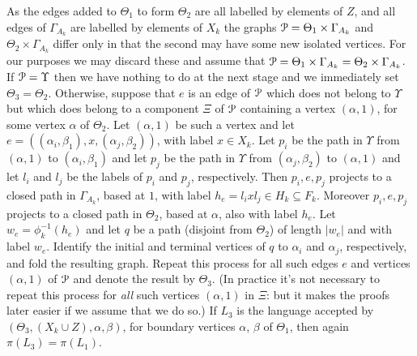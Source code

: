 \documentclass[a4paper,12pt]{article}
\renewcommand{\a}{\alpha }
\renewcommand{\b}{\beta }
\newcommand{\G}{\Gamma }
\newcommand{\T}{\Theta }
\newcommand{\U}{\Upsilon }
\newcommand{\cP}{{\cal{P}}}
\numberwithin{equation}{section}
\numberwithin{figure}{section}
\begin{document}
As the edges added to $\T_1$ to form $\T_2$ are all labelled by elements
of $Z$, and all edges of $\G_{A_k}$ are labelled by elements of $X_k$
the graphs $\cP=\T_1\times \G_{A_k}$ and $\T_2\times \G_{A_k}$ differ only
in that the second may have some new isolated vertices. For our purposes
we may discard these and assume that $\cP=\T_1\times \G_{A_k}=
 \T_2\times \G_{A_k}$. If $\cP=\U$ then we have nothing to do at the
next stage and we immediately set $\T_3=\T_2$. Otherwise,
suppose that $e$ is an edge of $\cP$ which does not belong to $\U$ but
which does belong to a component $\Xi$  of $\cP$ containing a vertex
$(\a,1)$, for some vertex $\a$ of $\T_2$.
Let $(\a,1)$ be such a vertex and let
$e=((\a_i,\b_1), x, (\a_j,\b_2))$,
 with label $x\in X_k$.
 Let $p_i$ be
the path in $\U$ from $(\a,1)$ to $(\a_i,\b_1)$ and let $p_j$ be
the path in $\U$ from  $(\a_j,\b_2)$ to $(\a,1)$ and
let $l_i$ and $l_j$ be the labels of $p_i$ and $p_j$, respectively. Then
$p_i,e,p_j$ projects to a closed path in $\G_{A_k}$, based at $1$, with
label $h_e=l_i x l_j \in H_k\subseteq F_k$. Moreover
$p_i,e,p_j$ projects to a closed path in $\T_2$, based at $\a$, also
with label $h_e$. Let
$w_e=\phi_k^{-1}(h_e)$ and let
$q$ be a path (disjoint from $\T_2$) of length
$|w_e|$ and with label $w_e$. Identify the initial and terminal
vertices of $q$ to $\a_i$ and $\a_j$, respectively, and fold the
resulting graph. Repeat this process for all such edges $e$ and
vertices $(\a,1)$ of $\cP$
and denote the result by $\T_3$.
(In practice it's not necessary to
repeat this process for {\em all} such vertices $(\a,1)$ in $\Xi$: but it
makes the proofs later easier if we assume that we do so.)
If
$L_3$ is the
language accepted by $(\T_3,(X_k\cup Z), \a,\b)$, for boundary
vertices $\a$, $\b$ of $\T_1$, then again $\pi(L_3)=\pi(L_1)$.
\end{document}
